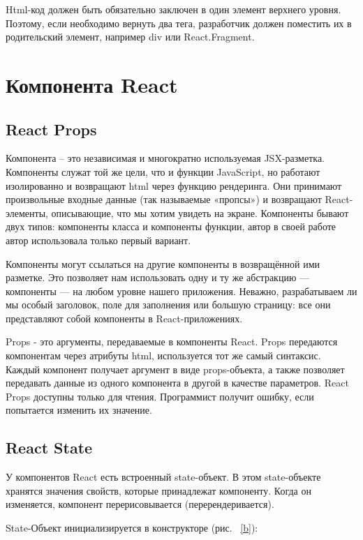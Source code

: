 \documentclass[a4paper,12pt]{diplom}
\begin{document}
Html-код должен быть обязательно заключен в один элемент верхнего уровня.
Поэтому, если необходимо вернуть два тега, разработчик должен поместить их в родительский элемент, например div или React.Fragment.
\section{Компонента React}

\subsection{React Props}

Компонента -- это независимая и многократно используемая JSX-разметка. Компоненты служат той же цели, что и функции JavaScript, но работают изолированно и возвращают html через функцию рендеринга. Они принимают произвольные входные данные (так называемые «пропсы») и возвращают React-элементы, описывающие, что мы хотим увидеть на экране.
Компоненты бывают двух типов: компоненты класса и компоненты функции, автор в своей работе автор использовала только первый вариант.

Компоненты могут ссылаться на другие компоненты в возвращённой ими разметке. Это позволяет нам использовать одну и ту же абстракцию — компоненты — на любом уровне нашего приложения. Неважно, разрабатываем ли мы особый заголовок, поле для заполнения или большую страницу: все они представляют собой компоненты в React-приложениях.

Props - это аргументы, передаваемые в компоненты React.
Props передаются компонентам через атрибуты html, используется тот же самый синтаксис. Каждый компонент получает аргумент в виде props-объекта, а также позволяет передавать данные из одного компонента в другой в качестве параметров. React Props доступны только для чтения. Программист получит ошибку, если попытается изменить их значение.

\subsection{React State}
У компонентов React есть встроенный state-объект.
В этом state-объекте хранятся значения свойств, которые принадлежат компоненту.
Когда он изменяется, компонент перерисовывается (перерендеривается).

State-Объект инициализируется в конструкторе (рис. ~\ref{b}):
\end{document}
